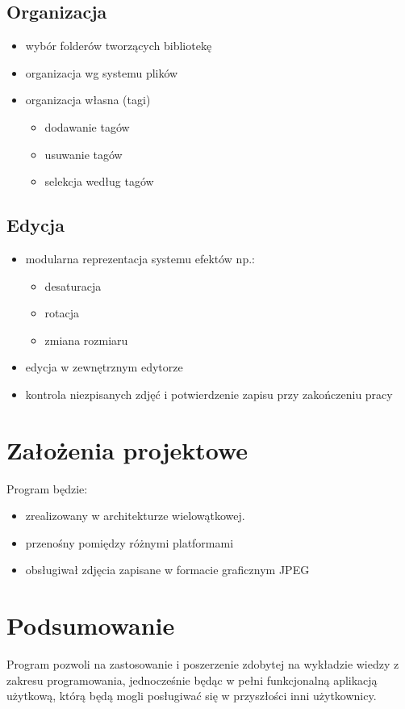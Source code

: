 \documentclass[11pt,a4paper]{article}
\begin{document}
\subsection{Organizacja}
\begin{itemize}
  \item wybór folderów tworzących bibliotekę
  \item organizacja wg systemu plików
  \item organizacja własna (tagi)
  \begin{itemize}
    \item dodawanie tagów 
    \item usuwanie tagów
    \item selekcja według tagów
  \end{itemize}
\end{itemize}

\subsection{Edycja}
\begin{itemize}
  \item modularna reprezentacja systemu efektów np.:
      \begin{itemize}
        \item desaturacja
        \item rotacja
        \item zmiana rozmiaru
      \end{itemize}
  \item edycja w zewnętrznym edytorze
  \item kontrola niezpisanych zdjęć i potwierdzenie zapisu przy zakończeniu pracy
\end{itemize}

\section{Założenia projektowe}
Program będzie:
\begin{itemize}
  \item zrealizowany w architekturze wielowątkowej.
  \item przenośny pomiędzy różnymi platformami 
  \item obsługiwał zdjęcia zapisane w formacie graficznym JPEG
\end{itemize}

\section{Podsumowanie}
Program pozwoli na zastosowanie i poszerzenie zdobytej na wykładzie wiedzy z zakresu programowania, jednocześnie będąc w pełni funkcjonalną aplikacją użytkową, którą będą mogli posługiwać się w przyszłości inni użytkownicy.
\end{document}
